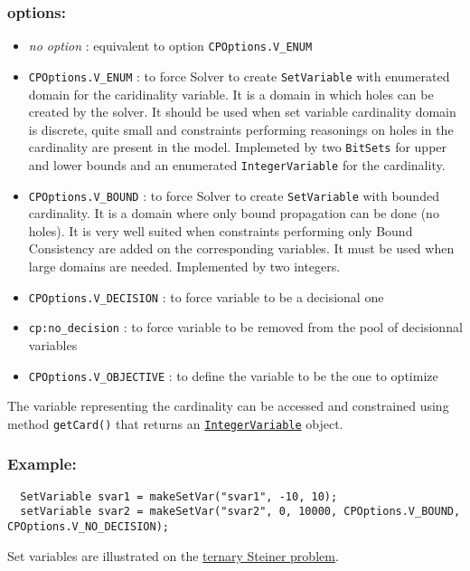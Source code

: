 \subsubsection{options:}
	\begin{itemize}
		\item \emph{no option} : equivalent to option \texttt{CPOptions.V_ENUM}
		\item \texttt{CPOptions.V_ENUM} : to force Solver to create \texttt{SetVariable} with enumerated domain for the caridinality variable. It is a domain in which holes can be created by the solver. It should be used when set variable cardinality domain is discrete, quite small and constraints performing reasonings on holes in the cardinality are present in the model. Implemeted by two \texttt{BitSets} for upper and lower bounds and an enumerated \texttt{IntegerVariable} for the cardinality.
		\item \texttt{CPOptions.V_BOUND} : to force Solver to create \texttt{SetVariable} with bounded cardinality. It is a domain where only bound propagation can be done (no holes). It is very well suited when constraints performing only Bound Consistency are added on the corresponding variables. It must be used when large domains are needed. Implemented by two integers.
		\item \texttt{CPOptions.V_DECISION} : to force variable to be a decisional one
		\item \texttt{cp:no\_decision} : to force variable to be removed from the pool of decisionnal variables
		\item \texttt{CPOptions.V_OBJECTIVE} : to define the variable to be the one to optimize
	\end{itemize}

The variable representing the cardinality can be accessed and constrained using method \texttt{getCard()} that returns an \hyperlink{integervariable}{\tt IntegerVariable} object.

\subsubsection{Example:}
\begin{lstlisting}
  SetVariable svar1 = makeSetVar("svar1", -10, 10);
  setVariable svar2 = makeSetVar("svar2", 0, 10000, CPOptions.V_BOUND, CPOptions.V_NO_DECISION);
\end{lstlisting} 

Set variables are illustrated on the \hyperlink{model:example2:ternarysteinerchoco}{ternary Steiner problem}. 


